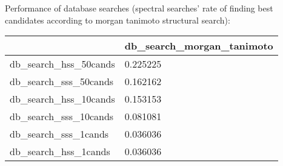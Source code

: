 Performance of database searches (spectral searches' rate of finding best candidates according to morgan tanimoto structural search):
\begin{tabular}{ll}
\toprule
 & db_search_morgan_tanimoto \\
\midrule
db_search_hss_50cands & 0.225225 \\
db_search_sss_50cands & 0.162162 \\
db_search_hss_10cands & 0.153153 \\
db_search_sss_10cands & 0.081081 \\
db_search_sss_1cands & 0.036036 \\
db_search_hss_1cands & 0.036036 \\
\bottomrule
\end{tabular}
